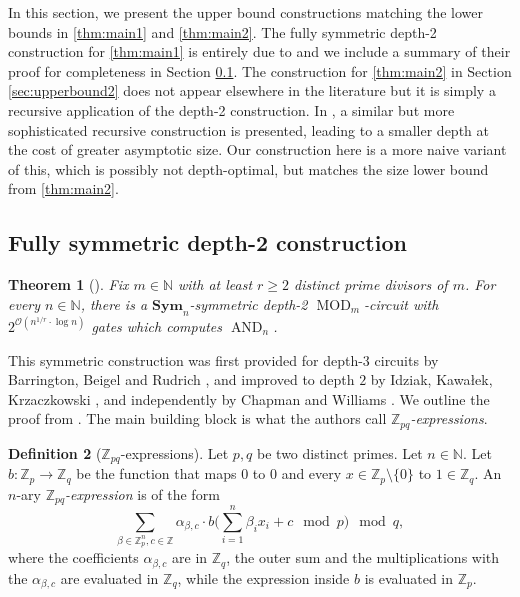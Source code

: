 \documentclass[11pt]{article}
\DeclareMathOperator{\MOD}{MOD}
\DeclareMathOperator{\AND}{AND}
\newcommand{\Sym}{\mathbf{Sym}}
\newcommand{\bbN}{\mathbb{N}}
\newcommand{\bbZ}{\mathbb{Z}}
\newcommand{\Oo}{{\mathcal O}}
\theoremstyle{definition}
\newtheorem{definition}{Definition}[section]
\theoremstyle{plain}
\newtheorem{theorem}[definition]{Theorem}
\theoremstyle{remark}
\theoremstyle{remark}
\begin{document}
In this section, we present the upper bound constructions matching the lower bounds in \cref{thm:main1} and \cref{thm:main2}. The fully symmetric depth-2 construction for \cref{thm:main1} is entirely due to \cite{IdziakKK22LICS} and we include a summary of their proof for completeness in Section \ref{sec:upperbound1}. 
The construction for \cref{thm:main2} in Section \ref{sec:upperbound2} does not appear elsewhere in the literature but it is simply a recursive application of the depth-2 construction. In \cite{IdziakKK22LICS}, a similar but more sophisticated recursive construction is presented, leading to a smaller depth at the cost of greater asymptotic size. Our construction here is a more naive variant of this, which is possibly not depth-optimal, but matches the size lower bound from \cref{thm:main2}.


\subsection{Fully symmetric depth-2 construction}
\label{sec:upperbound1}
\begin{theorem}[{\cite[Proposition 3.1]{IdziakKK22LICS}}]
\label{thm:upperbound1}
   Fix $m\in \mathbb{N}$ with at least $r \geq 2$ distinct prime divisors of $m$. For every $n \in \bbN$, there is a $\Sym_n$-symmetric depth-2 $\MOD_m$-circuit with $2^{\Oo(n^{1/r} \cdot \log n)}$ gates which computes $\AND_n$.
\end{theorem}
This symmetric construction was first provided for depth-$3$ circuits by Barrington, Beigel and Rudrich \cite{BarringtonBR94}, and improved to depth $2$ by Idziak, Kawałek, Krzaczkowski \cite{IdziakKK22LICS}, and independently by Chapman and Williams \cite{ChapmanW22}. 
We outline the proof from \cite{IdziakKK22LICS}.
The main building block is what the authors call \emph{$\bbZ_{pq}$-expressions}. 

\begin{definition}[$\bbZ_{pq}$-expressions]
	Let $p,q$ be two distinct primes. Let $n \in \bbN$. 
	Let $b \colon \bbZ_p \to \bbZ_q$ be the function that maps $0$ to $0$ and every $x \in \bbZ_p \setminus \{0\}$ to $1 \in \bbZ_q$. 
	An $n$-ary \emph{$\bbZ_{pq}$-expression} is of the form
	\[
	\sum_{\beta \in \bbZ_p^n, c \in \bbZ} \alpha_{\beta,c} \cdot b\Big(\sum_{i =1}^n \beta_ix_i +c   \mod p \Big) \mod q,
	\]
	where the coefficients $\alpha_{\beta, c}$ are in $\bbZ_q$, the outer sum and the multiplications with the $\alpha_{\beta, c}$ are evaluated in $\bbZ_q$, while the expression inside $b$ is evaluated in $\bbZ_p$. 
\end{definition}	
\end{document}
